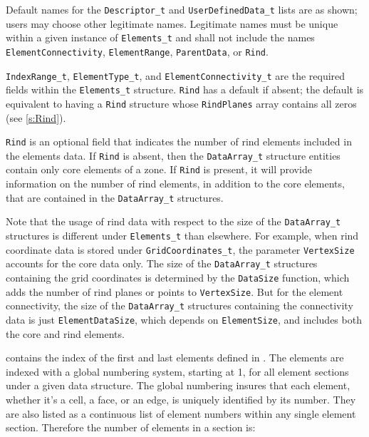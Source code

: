\begin{notes}
\item Default names for the \texttt{Descriptor\_t} and
      \texttt{UserDefinedData\_t} lists are as shown; users may choose
      other legitimate names.
      Legitimate names must be unique within a given instance
      of \texttt{Elements\_t} and shall not include the names
      \texttt{ElementConnectivity}, \texttt{ElementRange},
      \texttt{ParentData}, or \texttt{Rind}.
\item \texttt{IndexRange\_t}, \texttt{ElementType\_t}, and
      \texttt{ElementConnectivity\_t} are the required fields within the
      \texttt{Elements\_t} structure.
      \texttt{Rind} has a default if absent; the default is equivalent
      to having a \texttt{Rind} structure whose \texttt{RindPlanes}
      array contains all zeros (see \autoref{s:Rind}).
\end{notes}

\texttt{Rind} is an optional field that indicates the number of rind
elements included in the elements data.
If \texttt{Rind} is absent, then the \texttt{DataArray\_t} structure
entities contain only core elements of a zone.
If \texttt{Rind} is present, it will provide information on the number
of rind elements, in addition to the core elements, that are contained
in the \texttt{DataArray\_t} structures.

Note that the usage of rind data with respect to the size of the
\texttt{DataArray\_t} structures is different under \texttt{Elements\_t}
than elsewhere.
For example, when rind coordinate data is stored under
\texttt{GridCoordinates\_t}, the parameter \texttt{VertexSize} accounts
for the core data only.
The size of the \texttt{DataArray\_t} structures containing the grid
coordinates is determined by the \texttt{DataSize} function, which adds
the number of rind planes or points to \texttt{VertexSize}.
But for the element connectivity, the size of the \texttt{DataArray\_t}
structures containing the connectivity data is just
\texttt{ElementDataSize}, which depends on \texttt{ElementSize}, and
includes both the core and rind elements.

 contains the index of the first and last elements defined
in .
The elements are indexed with a global numbering system, starting at 1,
for all element sections under a given  data structure.
The global numbering insures that each element, whether it's a cell,
a face, or an edge, is uniquely identified by its number.
They are also listed as a continuous list of element numbers within
any single element section.
Therefore the number of elements in a section is:

